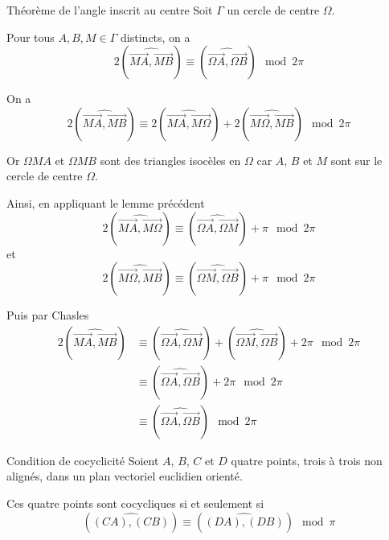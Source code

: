 \documentclass[a4paper, 12pt]{article}
\begin{document}
\pagebreak

\begin{theoreme}{Théorème de l'angle inscrit au centre}{}
    Soit $\Gamma$ un cercle de centre $\Omega$.

    Pour tous $A, B, M \in \Gamma$ distincts, on a
    $$
    2(\widehat{\overrightarrow{MA}, \overrightarrow{MB}}) \equiv (\widehat{\overrightarrow{\Omega A}, \overrightarrow{\Omega B}}) \mod 2\pi
    $$
\end{theoreme}

\tikzexternalenable
\begin{figure}[H]
    \centering
    \resizebox{0.7\textwidth}{!}{%
    
    }
\end{figure}
\tikzexternaldisable

\begin{demonstration}
    On a
    $$
    2(\widehat{\overrightarrow{MA}, \overrightarrow{MB}}) \equiv 2(\widehat{\overrightarrow{MA}, \overrightarrow{M\Omega}}) + 2(\widehat{\overrightarrow{M\Omega}, \overrightarrow{MB}}) \mod 2\pi
    $$

    Or $\Omega M A$ et $\Omega M B$ sont des triangles isocèles en $\Omega$ car $A$, $B$ et $M$ sont sur le cercle de centre $\Omega$.

    Ainsi, en appliquant le lemme précédent
    $$
    2(\widehat{\overrightarrow{MA}, \overrightarrow{M\Omega}}) \equiv (\widehat{\overrightarrow{\Omega A}, \overrightarrow{\Omega M}}) + \pi \mod 2\pi
    $$
    et
    $$
    2(\widehat{\overrightarrow{M\Omega}, \overrightarrow{MB}}) \equiv (\widehat{\overrightarrow{\Omega M}, \overrightarrow{\Omega B}}) + \pi \mod 2\pi
    $$

    Puis par Chasles
    \begin{align*}
        2(\widehat{\overrightarrow{MA}, \overrightarrow{MB}}) &\equiv (\widehat{\overrightarrow{\Omega A}, \overrightarrow{\Omega M}}) + (\widehat{\overrightarrow{\Omega M}, \overrightarrow{\Omega B}}) + 2\pi \mod 2\pi \\
        &\equiv (\widehat{\overrightarrow{\Omega A}, \overrightarrow{\Omega B}}) + 2\pi \mod 2\pi \\
        &\equiv (\widehat{\overrightarrow{\Omega A}, \overrightarrow{\Omega B}}) \mod 2\pi
    \end{align*}
\end{demonstration}

\begin{theoreme}{Condition de cocyclicité}{}
    Soient $A$, $B$, $C$ et $D$ quatre points, trois à trois non alignés, dans un plan vectoriel euclidien orienté.

    Ces quatre points sont cocycliques si et seulement si
    $$
    (\widehat{(CA), (CB)}) \equiv (\widehat{(DA), (DB)}) \mod \pi
    $$
\end{theoreme}
\end{document}
